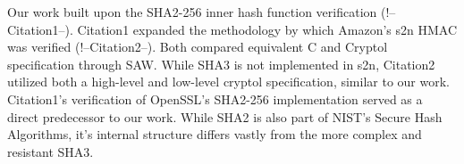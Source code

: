 Our work built upon the SHA2-256 inner hash function verification (!--Citation1--).
Citation1 expanded the methodology by which Amazon's s2n HMAC was verified (!--Citation2--).
Both compared equivalent C and Cryptol specification through SAW.
While SHA3 is not implemented in s2n, Citation2 utilized both a high-level and low-level cryptol specification, similar to our work.
Citation1's verification of OpenSSL's SHA2-256 implementation served as a direct predecessor to our work.
While SHA2 is also part of NIST's Secure Hash Algorithms, it's internal structure differs vastly from the more complex and resistant SHA3. 